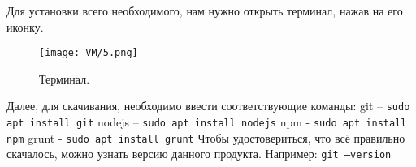 Для установки всего необходимого, нам нужно открыть терминал, нажав на его иконку. 

\begin{figure}[h]
		\centering
		\texttt{[image: VM/5.png]}
\caption{Терминал.}
\label{ris:image}
\end{figure}

Далее, для скачивания, необходимо ввести соответствующие команды:
\newline git – \texttt{sudo apt install git}
\newline nodejs – \texttt{sudo apt install nodejs}
\newline npm - \texttt{sudo apt install npm}
\newline grunt - \texttt{sudo apt install grunt}
\newline Чтобы удостовериться, что всё правильно скачалось, можно узнать версию данного продукта. Например: \texttt{git ---version}